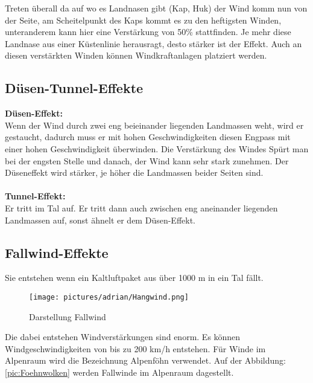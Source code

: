 \documentclass[12pt]{scrbook}
\begin{document}
Treten überall da auf wo es Landnasen gibt (Kap, Huk) der Wind komm nun von
der Seite, am Scheitelpunkt des Kaps kommt es zu den heftigsten Winden,
unteranderem kann hier eine Verstärkung von 50\% stattfinden. Je mehr diese
Landnase aus einer Küstenlinie herausragt, desto stärker ist der Effekt. Auch
an diesen verstärkten Winden können Windkraftanlagen platziert werden.


\newpage


\subsection{Düsen-Tunnel-Effekte}

{\bfseries Düsen-Effekt:}\\  
Wenn der Wind durch zwei eng beieinander liegenden Landmassen weht, wird er
gestaucht, dadurch muss er mit hohen Geschwindigkeiten diesen Engpass mit
einer hohen Geschwindigkeit überwinden. Die Verstärkung des Windes Spürt man
bei der engsten Stelle und danach, der Wind kann sehr stark zunehmen. Der
Düseneffekt wird stärker, je höher die Landmassen beider Seiten sind.\\
\\
{\bfseries Tunnel-Effekt:}\\  
Er tritt im Tal auf. Er tritt dann auch zwischen eng aneinander liegenden
Landmassen auf, sonst ähnelt er dem Düsen-Effekt.

\subsection{Fallwind-Effekte}

 Sie entstehen wenn ein Kaltluftpaket aus über 1000 m in ein Tal fällt. 
 
  \begin{wrapfigure}[7]{r}{0.51\textwidth}
 	\vspace{-20pt}
	\centering
    \texttt{[image: pictures/adrian/Hangwind.png]}
  	\caption{Darstellung Fallwind}
  	\label{pic:Darstellung Fallwind}
\end{wrapfigure}
 Die dabei entstehen Windverstärkungen sind enorm. Es können \\
 Windgeschwindigkeiten  von bis zu 200 km/h entstehen. Für Winde im 
 Alpenraum wird die Bezeichnung Alpenföhn verwendet. 
 Auf der Abbildung: \ref{pic:Foehnwolken} werden Fallwinde im Alpenraum dagestellt.
 
\end{document}
